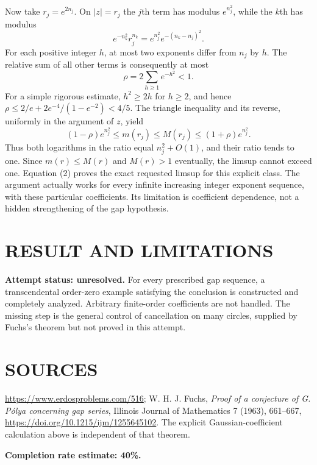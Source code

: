 Now take $r_j=e^{2n_j}$. On $|z|=r_j$ the $j$th term has modulus $e^{n_j^2}$, while the $k$th has modulus
\[
 e^{-n_k^2}r_j^{n_k}
 =e^{n_j^2}e^{-(n_k-n_j)^2}.
\]
For each positive integer $h$, at most two exponents differ from $n_j$ by $h$. The relative sum of all other terms is consequently at most
\[
 \rho=2\sum_{h\geq1}e^{-h^2}<1.
\]
For a simple rigorous estimate, $h^2\geq2h$ for $h\geq2$, and hence
$\rho\leq2/e+2e^{-4}/(1-e^{-2})<4/5$.
The triangle inequality and its reverse, uniformly in the argument of $z$, yield
\[
 (1-\rho)e^{n_j^2}\leq m(r_j)\leq M(r_j)
 \leq(1+\rho)e^{n_j^2}.                                \tag{2}
\]
Thus both logarithms in the ratio equal $n_j^2+O(1)$, and their ratio tends to one. Since $m(r)\leq M(r)$ and $M(r)>1$ eventually, the limsup cannot exceed one. Equation (2) proves the exact requested limsup for this explicit class.
The argument actually works for every infinite increasing integer exponent sequence, with these particular coefficients. Its limitation is coefficient dependence, not a hidden strengthening of the gap hypothesis.

\section{RESULT AND LIMITATIONS}
\textbf{Attempt status: unresolved.} For every prescribed gap sequence, a transcendental order-zero example satisfying the conclusion is constructed and completely analyzed. Arbitrary finite-order coefficients are not handled. The missing step is the general control of cancellation on many circles, supplied by Fuchs's theorem but not proved in this attempt.

\section{SOURCES}
\url{https://www.erdosproblems.com/516}; W. H. J. Fuchs, \emph{Proof of a conjecture of G. P\'olya concerning gap series}, Illinois Journal of Mathematics 7 (1963), 661--667, \url{https://doi.org/10.1215/ijm/1255645102}. The explicit Gaussian-coefficient calculation above is independent of that theorem.

\textbf{Completion rate estimate: 40\%.}
